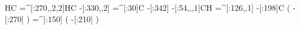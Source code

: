                  HC%
    =^[:270,,2,2]HC%
       -[:330,,2]%
          =^[:30]C%
          -[:342]%
       -[:54,,,1]CH%
      =^[:126,,1]%
          -[:198]C%
                    (
              -[:270]\phantom{C}%
                    )
         =^[:150]%
                    (
              -[:210]\phantom{C}%
                    )